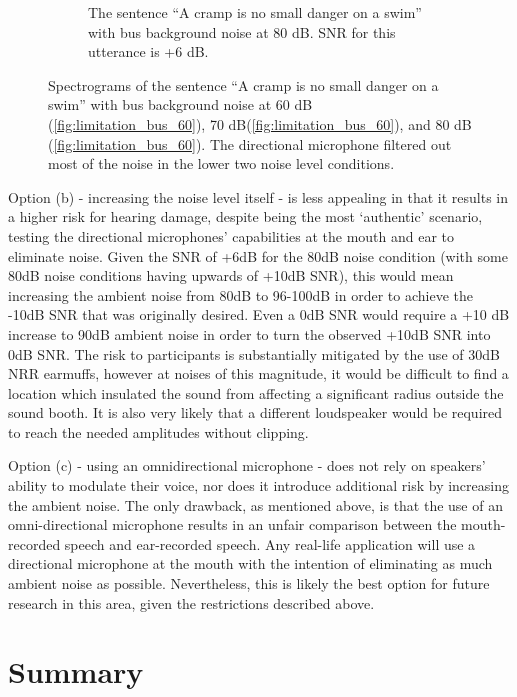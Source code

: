\begin{figure}[h!]
\begin{center}
\begin{subfigure}{0.475\textwidth}
  \caption{The sentence ``A cramp is no small danger on a swim'' with bus background noise at 80 dB. SNR for this utterance is +6 dB.}
  \label{fig:limitation_bus_80}
\end{subfigure}
\end{center}
\caption{Spectrograms of the sentence ``A cramp is no small danger on a swim'' with bus background noise at 60 dB (\ref{fig:limitation_bus_60}), 70 dB(\ref{fig:limitation_bus_60}), and 80 dB (\ref{fig:limitation_bus_60}). The directional microphone filtered out most of the noise in the lower two noise level conditions.}
\label{fig:noise_level_limitation}
\end{figure}

Option (b) - increasing the noise level itself - is less appealing in that it results in a higher risk for hearing damage, despite being the most `authentic' scenario, testing the directional microphones' capabilities at the mouth and ear to eliminate noise.  Given the SNR of +6dB for the 80dB noise condition (with some 80dB noise conditions having upwards of +10dB SNR), this would mean increasing the ambient noise from 80dB to 96-100dB in order to achieve the -10dB SNR that was originally desired.  Even a 0dB SNR would require a +10 dB increase to 90dB ambient noise in order to turn the observed +10dB SNR into 0dB SNR. The risk to participants is substantially mitigated by the use of 30dB NRR earmuffs, however at noises of this magnitude, it would be difficult to find a location which insulated the sound from affecting a significant radius outside the sound booth.  It is also very likely that a different loudspeaker would be required to reach the needed amplitudes without clipping.

Option (c) - using an omnidirectional microphone - does not rely on speakers' ability to modulate their voice, nor does it introduce additional risk by increasing the ambient noise.  The only drawback, as mentioned above, is that the use of an omni-directional microphone results in an unfair comparison between the mouth-recorded speech and ear-recorded speech.  Any real-life application will use a directional microphone at the mouth with the intention of eliminating as much ambient noise as possible.  Nevertheless, this is likely the best option for future research in this area, given the restrictions described above.

\section{Summary}\label{chap2:summary}

